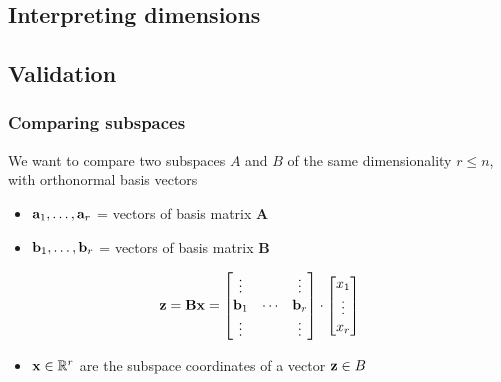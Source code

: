 \documentclass[t]{beamer} %
\begin{document}

\subsection{Interpreting dimensions}


\subsection{Validation }

\begin{frame}
  \frametitle{Comparing subspaces}

  We want to compare two subspaces $A$ and $B$ of the same dimensionality $r \leq n$, with
  orthonormal basis vectors
  \begin{itemize}
  \item $\va_1, \ldots, \va_r$ =  vectors of basis matrix $\mathbf{A}$
  \item $\vb_1, \ldots, \vb_r$ =  vectors of basis matrix $\mathbf{B}$
  \end{itemize}

  \[
    \vz = \mathbf{B} \vx =
    \begin{bmatrix}
      \vdots & & \vdots \\
      \vb_1 & \cdots & \vb_r \\
      \vdots & & \vdots
    \end{bmatrix}
    \cdot
    \begin{bmatrix}
      x_1 \\
      \vdots \\
      x_r
    \end{bmatrix}
  \]
  
  \begin{itemize}
  \item[\hand] $\vx\in \setR^r$ are the subspace coordinates of a vector $\vz\in B$
  \end{itemize}
\end{frame}

\end{document}
